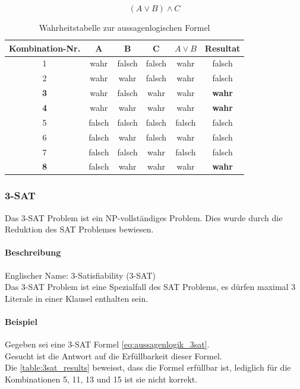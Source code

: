 	\begin{equation}
   		(A \vee B) \wedge C
  		 \label{eq:aussagenlogik}
	\end{equation}

\begin{table}[ht]
\centering
  \begin{tabular}{ c | c | c | c | c | c}
	\hline
	\rowcolor{gray}
	\textbf{Kombination-Nr.}	&	\textbf{A}	&	\textbf{B} 	& 	\textbf{C} 	&	$A \vee B$	&	\textbf{Resultat}\\ \hline
	1			&	wahr	& 	falsch	& 	falsch	&	wahr		&	falsch\\ \hline
	2			&	wahr	& 	wahr	& 	falsch	&	wahr		&	falsch\\ \hline
	\textbf{3}		&	wahr	& 	falsch	& 	wahr	&	wahr		&	\textbf{wahr}\\ \hline
	\textbf{4}		&	wahr	& 	wahr	& 	wahr	&	wahr		&	\textbf{wahr}\\ \hline
	5			&	falsch	& 	falsch	& 	falsch	&	falsch		&	falsch\\ \hline
	6			&	falsch	& 	wahr	& 	falsch	&	wahr		&	falsch\\ \hline
	7			&	falsch	& 	falsch	& 	wahr	&	falsch		&	falsch\\ \hline
	\textbf{8}		&	falsch	& 	wahr	& 	wahr	&	wahr		&	\textbf{wahr}\\ \hline
  \end{tabular}
   \caption{Wahrheitstabelle zur aussagenlogischen Formel}\label{table:sat_results}
\end{table}

\newpage
	\subsubsection{3-SAT}\label{3sat}
	Das 3-SAT Problem ist ein NP-vollständiges Problem. Dies wurde durch die Reduktion des SAT Problemes bewiesen.

	\paragraph{Beschreibung}
	Englischer Name: 3-Satisfiability (3-SAT)\\
	Das 3-SAT Problem ist eine Spezialfall des SAT Problems, es dürfen maximal 3 Literale in einer Klausel enthalten sein.

	\paragraph{Beispiel} Gegeben sei eine 3-SAT Formel \ref{eq:aussagenlogik_3sat}.\\
	Gesucht ist die Antwort auf die Erfüllbarkeit dieser Formel.\\
	Die \autoref{table:3sat_results} beweisst, dass die Formel erfüllbar ist, lediglich für die Kombinationen 5, 11, 13 und 15 ist sie nicht korrekt.

